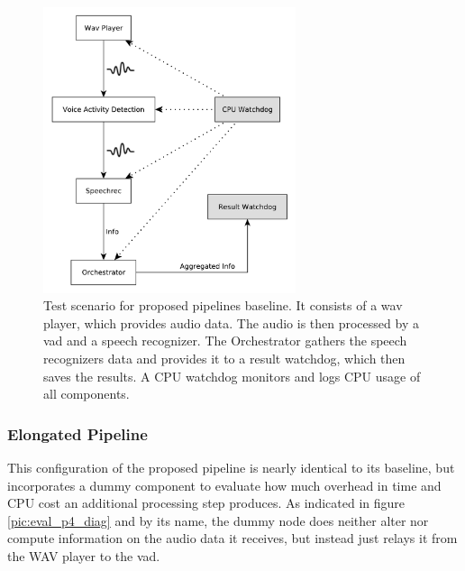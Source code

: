 \begin{figure}[]
	\centering
	\includegraphics[width=0.66\textwidth]{diagrams/eval_pipeline_2.pdf}
	\caption{Test scenario for proposed pipelines baseline.
		It consists of a wav player, which provides audio data.
		The audio is then processed by a \gls{vad} and a speech recognizer.
		The Orchestrator gathers the speech recognizers data and provides it to a result watchdog, which then saves the results.
		A CPU watchdog monitors and logs CPU usage of all components.}
	\label{pic:eval_p2_diag}
\end{figure}


\subsubsection{Elongated Pipeline}
This configuration of the proposed pipeline is nearly identical to its baseline, but incorporates a dummy component to evaluate how much overhead in time and CPU cost an additional processing step produces.
As indicated in figure \ref{pic:eval_p4_diag} and by its name, the dummy node does neither alter nor compute information on the audio data it receives, but instead just relays it from the WAV player to the \gls{vad}.

